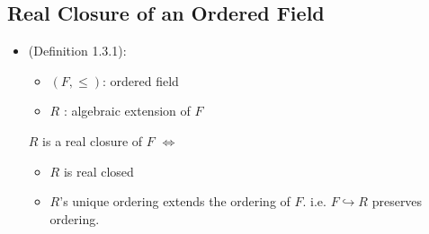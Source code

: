 \documentclass[9pt]{ltjsarticle}
\begin{document}
\subsection{Real Closure of an Ordered Field}
\label{sub:Real Closure of an Ordered Field}
\begin{itemize}
  \item (Definition 1.3.1):
  \begin{itemize}
    \item $(F,\le)$: ordered field
    \item $R$ : algebraic extension of $F$
  \end{itemize}
  $R$ is a real closure of $F$ $\iff$
  \begin{itemize}
    \item $R$ is real closed
    \item $R$'s unique ordering extends the ordering of $F$.
    i.e. $F \hookrightarrow R$ preserves ordering.
  \end{itemize}


\end{itemize}
\end{document}
